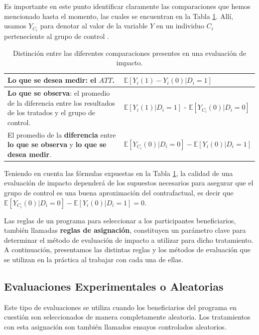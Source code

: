 \documentclass[../../main.tex]{subfiles}
\begin{document}
\bigskip
Es importante en este punto identificar claramente las comparaciones que hemos mencionado
hasta el momento, las cuales se encuentran en la Tabla \ref{tab:distinciones}. Allí,
usamos \(Y_{C_i}\) para denotar al valor de la variable \(Y\) en un individuo \(C_i\)
perteneciente al grupo de control .
\begin{table}[h!]
    \centering
    \begin{tabular}{p{7cm}m{7cm}}  %
        \hline
        \textbf{Lo que se desea medir}: el \(ATT\).
            & \(\mathbb{E} \left[Y_i(1)-Y_i(0)|D_i=1\right]\)
            \\
        \hline
        \textbf{Lo que se observa}: el promedio de la diferencia entre los resultados de
        los tratados y el grupo de control.
            & \(\mathbb{E} \left[Y_i(1)|D_i=1\right]\) - \(\mathbb{E} \left[Y_{C_i}(0)|D_i=0\right]\)
            \\
        \hline
        El promedio de la \textbf{diferencia} entre \textbf{lo que se observa} y
        \textbf{lo que se desea medir}.
            & \(\mathbb{E} \left[Y_{C_i}(0)|D_i=0\right] - \mathbb{E}\left[Y_i(0)|D_i=1\right]\)
        \\
        \hline
    \end{tabular}
    \caption{Distinción entre las diferentes comparaciones presentes en una evaluación de impacto.}
    \label{tab:distinciones}
\end{table}

Teniendo en cuenta las fórmulas expuestas en la Tabla \ref{tab:distinciones}, la calidad
de una evaluación de impacto dependerá de los supuestos necesarios para asegurar que el
grupo de control es una buena aproximación del contrafactual, es decir que \(\mathbb{E}
\left[Y_{C_i}(0)|D_i=0\right] - \mathbb{E}\left[Y_i(0)|D_i=1\right] = 0\).

\bigskip
Las reglas de un programa para seleccionar a los participantes beneficiarios, también
llamadas \textbf{reglas de asignación}, constituyen un parámetro clave para determinar el
método de evaluación de impacto a utilizar para dicho tratamiento. A continuación,
presentamos las distintas reglas y los métodos de evaluación que se utilizan en la
práctica al trabajar con cada una de ellas.

\subsection{Evaluaciones Experimentales o Aleatorias}
Este tipo de evaluaciones se utiliza cuando los beneficiarios del programa en cuestión son
seleccionados de manera completamente aleatoria\footnotemark. Los tratamientos con esta
asignación son también llamados ensayos controlados aleatorios. 
\end{document}
